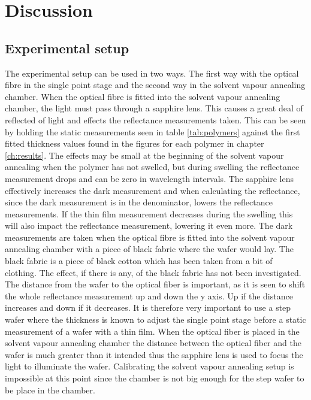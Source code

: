 \documentclass[MasterThesisMain.tex]{subfiles}
\begin{document}
\chapter{Discussion}

\section{Experimental setup}
The experimental setup can be used in two ways. The first way with the optical fibre in the single point stage and the second way in the solvent vapour annealing chamber. When the optical fibre is fitted into the solvent vapour annealing chamber, the light must pass through a sapphire lens. This causes a great deal of reflected of light and effects the reflectance measurements taken. This can be seen by holding the static measurements seen in table \ref{tab:polymers} against the first fitted thickness values found in the figures for each polymer in chapter \ref{ch:results}. The effects may be small at the beginning of the solvent vapour annealing when the polymer has not swelled, but during swelling the reflectance measurement drops and can be zero in wavelength intervals. The sapphire lens effectively increases the dark measurement and when calculating the reflectance, since the dark measurement is in the denominator, lowers the reflectance measurements. If the thin film measurement decreases during the swelling this will also impact the reflectance measurement, lowering it even more. The dark measurements are taken when the optical fibre is fitted into the solvent vapour annealing chamber with a piece of black fabric where the wafer would lay. The black fabric is a piece of black cotton which has been taken from a bit of clothing. The effect, if there is any, of the black fabric has not been investigated. The distance from the wafer to the optical fiber is important, as it is seen to shift the whole reflectance measurement up and down the y axis. Up if the distance increases and down if it decreases. It is therefore very important to use a step wafer where the thickness is known to adjust the single point stage before a static measurement of a wafer with a thin film. When the optical fiber is placed in the solvent vapour annealing chamber the distance between the optical fiber and the wafer is much greater than it intended thus the sapphire lens is used to focus the light to illuminate the wafer. Calibrating the solvent vapour annealing setup is impossible at this point since the chamber is not big enough for the step wafer to be place in the chamber.
\end{document}
